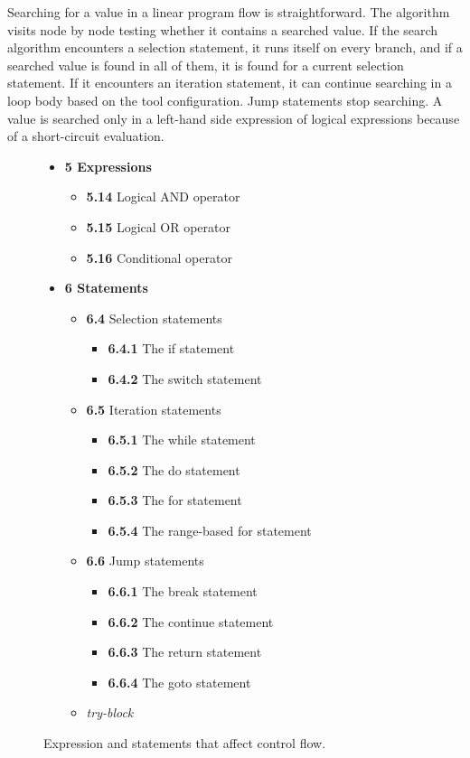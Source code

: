 Searching for a value in a linear program flow is straightforward. The algorithm visits node by node testing whether it contains a searched value. If the search algorithm encounters a selection statement, it runs itself on every branch, and if a searched value is found in all of them, it is found for a current selection statement. If it encounters an iteration statement, it can continue searching in a loop body based on the tool configuration. Jump statements stop searching. A value is searched only in a left-hand side expression of logical expressions because of a short-circuit evaluation.

\begin{figure}[t!]
\begin{itemize}
\item{\textbf{5 Expressions}}
	\begin{itemize}
	\item{\textbf{5.14} Logical AND operator}
	\item{\textbf{5.15} Logical OR operator}
	\item{\textbf{5.16} Conditional operator}
	\end{itemize}
\item{\textbf{6 Statements}}
	\begin{itemize}
	\item{\textbf{6.4} Selection statements}
		\begin{itemize}
		\item{\textbf{6.4.1} The if statement}
		\item{\textbf{6.4.2} The switch statement}
		\end{itemize}
	\item{\textbf{6.5} Iteration statements}
		\begin{itemize}
		\item{\textbf{6.5.1} The while statement}
		\item{\textbf{6.5.2} The do statement}
		\item{\textbf{6.5.3} The for statement}
		\item{\textbf{6.5.4} The range-based for statement}
		\end{itemize}
	\item{\textbf{6.6} Jump statements}
		\begin{itemize}
		\item{\textbf{6.6.1} The break statement}
		\item{\textbf{6.6.2} The continue statement}
		\item{\textbf{6.6.3} The return statement}
		\item{\textbf{6.6.4} The goto statement}
		\end{itemize}
	\item{\textit{try-block}}
	\end{itemize}
\end{itemize}
\caption{Expression and statements that affect control flow.}
\label{control-stmt-expr}
\end{figure}

